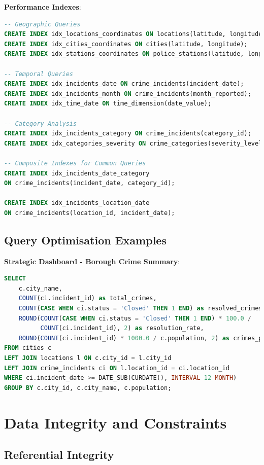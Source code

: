 \documentclass[12pt,a4paper]{article}
\begin{document}
\textbf{Performance Indexes}:
\begin{lstlisting}[language=SQL]
-- Geographic Queries
CREATE INDEX idx_locations_coordinates ON locations(latitude, longitude);
CREATE INDEX idx_cities_coordinates ON cities(latitude, longitude);
CREATE INDEX idx_stations_coordinates ON police_stations(latitude, longitude);

-- Temporal Queries
CREATE INDEX idx_incidents_date ON crime_incidents(incident_date);
CREATE INDEX idx_incidents_month ON crime_incidents(month_reported);
CREATE INDEX idx_time_date ON time_dimension(date_value);

-- Category Analysis
CREATE INDEX idx_incidents_category ON crime_incidents(category_id);
CREATE INDEX idx_categories_severity ON crime_categories(severity_level);

-- Composite Indexes for Common Queries
CREATE INDEX idx_incidents_date_category 
ON crime_incidents(incident_date, category_id);

CREATE INDEX idx_incidents_location_date 
ON crime_incidents(location_id, incident_date);
\end{lstlisting}

\subsection{Query Optimisation Examples}

\textbf{Strategic Dashboard - Borough Crime Summary}:
\begin{lstlisting}[language=SQL]
SELECT 
    c.city_name,
    COUNT(ci.incident_id) as total_crimes,
    COUNT(CASE WHEN ci.status = 'Closed' THEN 1 END) as resolved_crimes,
    ROUND(COUNT(CASE WHEN ci.status = 'Closed' THEN 1 END) * 100.0 / 
          COUNT(ci.incident_id), 2) as resolution_rate,
    ROUND(COUNT(ci.incident_id) * 1000.0 / c.population, 2) as crimes_per_1000
FROM cities c
LEFT JOIN locations l ON c.city_id = l.city_id
LEFT JOIN crime_incidents ci ON l.location_id = ci.location_id
WHERE ci.incident_date >= DATE_SUB(CURDATE(), INTERVAL 12 MONTH)
GROUP BY c.city_id, c.city_name, c.population;
\end{lstlisting}

\section{Data Integrity and Constraints}

\subsection{Referential Integrity}
\end{document}
